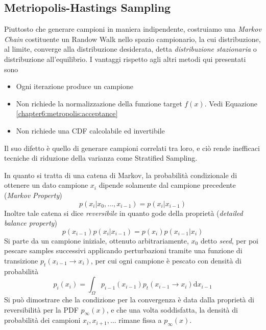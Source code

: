 \subsection{Metriopolis-Hastings Sampling}
Piuttosto che generare campioni in maniera indipendente, costruiamo una \textit{Markov Chain} co\-stituente un Randow Walk nello spazio campionario,
la cui distribuzione, al limite, converge alla distribuzione desiderata, detta \textit{distribuzione stazionaria} o distribuzione all'equilibrio. I 
vantaggi rispetto agli altri metodi qui presentati sono
\begin{itemize}[topsep=0pt,noitemsep]
	\item Ogni iterazione produce un campione
	\item Non richiede la normalizzazione della funzione target $f(x)$. Vedi Equazione \ref{chapter6:metropolis:acceptance}
	\item Non richiede una CDF calcolabile ed invertibile
\end{itemize}
Il suo difetto \`e quello di generare campioni correlati tra loro, e ci\`o rende inefficaci tecniche di riduzione della varianza come Stratified 
Sampling.\par
In quanto si tratta di una catena di Markov, la probabilit\`a condizionale di ottenere un dato campione $x_i$ dipende solamente dal campione precedente
(\textit{Markov Property})
\begin{equation}
	p(x_i | x_0,\ldots,x_{i-1})=p(x_i|x_{i-1})
\end{equation}
Inoltre tale catena si dice \textit{reversibile} in quanto gode della propriet\`a (\textit{detailed balance property})
\begin{equation}
	p(x_{i-1})p(x_i|x_{i-1})=p(x_i)p(x_{i-1}|x_i)
\end{equation}
Si parte da un campione iniziale, ottenuto arbitrariamente, $x_0$ detto \textit{seed}, per poi pescare samples successivi applicando perturbazioni 
tramite una funzione di transizione\footnotemark{} $p_t(x_{i-1}\to x_i)$, per cui ogni campione \`e pescato con densit\`a di probabilit\`a
\begin{equation}%
	p_i(x_i)=\int_{\Omega}p_{i-1}(x_{i-1})p_t(x_{i-1}\to x_i)\mathrm{d}x_{i-1}
\end{equation}
Si pu\`o dimostrare che 
la condizione per la convergenza \`e data dalla propriet\`a di reversibilit\`a per la PDF $p_\infty(x)$, e che una volta soddisfatta, la densit\`a di 
probabilit\`a dei campioni \mbox{$x_i, x_{i+1}, \ldots$} rimane fissa a $p_\infty(x)$.\par
